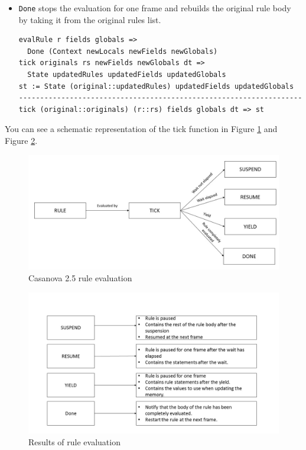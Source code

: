 \begin{itemize}
\begin{lstlisting}
\end{lstlisting}
\item \texttt{Done} stops the evaluation for one frame and rebuilds the original rule body by taking it from the original rules list.
\begin{lstlisting}
evalRule r fields globals => 
  Done (Context newLocals newFields newGlobals)
tick originals rs newFields newGlobals dt => 
  State updatedRules updatedFields updatedGlobals
st := State (original::updatedRules) updatedFields updatedGlobals
-------------------------------------------------------------------
tick (original::originals) (r::rs) fields globals dt => st
\end{lstlisting}
\end{itemize}

You can see a schematic representation of the tick function in Figure \ref{fig:tick} and Figure \ref{fig:tick2}.

\begin{figure}
	\centering
	\includegraphics[scale = 0.25]{Pictures/tick}
	\caption{Casanova 2.5 rule evaluation}
	\label{fig:tick}
\end{figure}

\begin{figure}
	\centering
	\includegraphics[scale = 0.25]{Pictures/tick2}
	\caption{Results of rule evaluation}
	\label{fig:tick2}
\end{figure}

